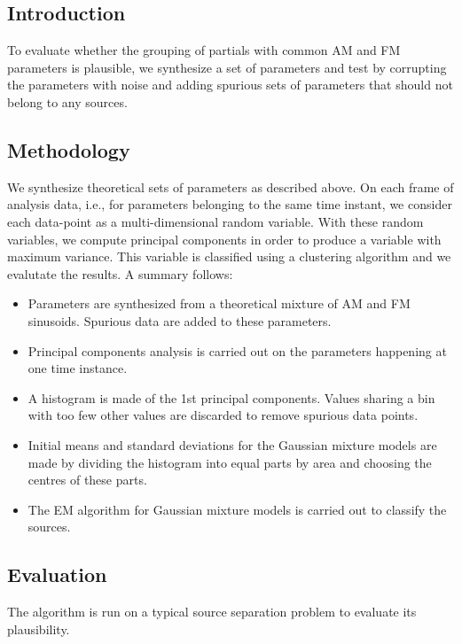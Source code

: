 \documentclass[letterpaper,12pt]{report}
\begin{document}
\subsection{Introduction}
To evaluate whether the grouping of partials with common AM and FM parameters is
plausible, we synthesize a set of parameters and test by corrupting the
parameters with noise and adding spurious sets of parameters that should not
belong to any sources.
\subsection{Methodology}
We synthesize theoretical sets of parameters as described above. On each frame
of analysis data, i.e., for parameters belonging to the same time instant, we
consider each data-point as a multi-dimensional random variable. With these
random variables, we compute principal components in order to produce a variable
with maximum variance. This variable is classified using a clustering algorithm
and we evalutate the results. A summary follows:
\begin{itemize}
    \item 
        Parameters are synthesized from a theoretical mixture of AM and FM
        sinusoids.  Spurious data are added to these parameters.
    \item
        Principal components analysis is carried out on the parameters happening
        at one time instance.
    \item
        A histogram is made of the 1st principal components. Values sharing a
        bin with too few other values are discarded to remove spurious data
        points.
    \item
        Initial means and standard deviations for the Gaussian mixture models
        are made by dividing the histogram into equal parts by area and choosing
        the centres of these parts.
    \item
        The EM algorithm for Gaussian mixture models is carried out to classify
        the sources.
\end{itemize}
\subsection{Evaluation}
The algorithm is run on a typical source separation problem to evaluate its
plausibility.
\end{document}
